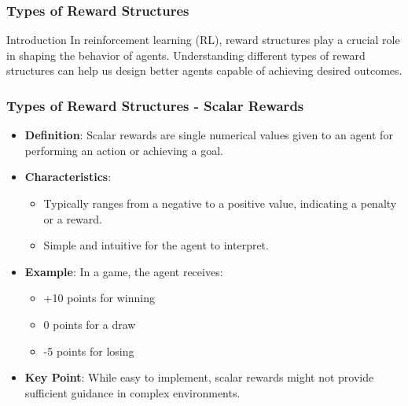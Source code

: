 \documentclass[aspectratio=169]{beamer}
\begin{document}
\begin{frame}[fragile]
    \frametitle{Types of Reward Structures}
    \begin{block}{Introduction}
        In reinforcement learning (RL), reward structures play a crucial role in shaping the behavior of agents. Understanding different types of reward structures can help us design better agents capable of achieving desired outcomes.
    \end{block}
\end{frame}

\begin{frame}[fragile]
    \frametitle{Types of Reward Structures - Scalar Rewards}
    \begin{itemize}
        \item \textbf{Definition}: Scalar rewards are single numerical values given to an agent for performing an action or achieving a goal.
        \item \textbf{Characteristics}:
        \begin{itemize}
            \item Typically ranges from a negative to a positive value, indicating a penalty or a reward.
            \item Simple and intuitive for the agent to interpret.
        \end{itemize}
        \item \textbf{Example}: In a game, the agent receives:
        \begin{itemize}
            \item +10 points for winning
            \item 0 points for a draw
            \item -5 points for losing
        \end{itemize}
        \item \textbf{Key Point}: While easy to implement, scalar rewards might not provide sufficient guidance in complex environments.
    \end{itemize}
\end{frame}
\end{document}
